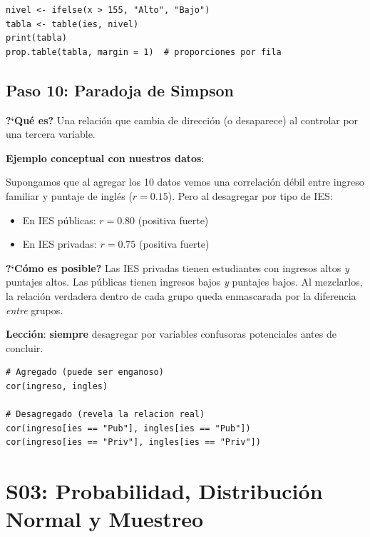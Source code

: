 \documentclass[11pt, a4paper]{article}
\begin{document}
\begin{lstlisting}
nivel <- ifelse(x > 155, "Alto", "Bajo")
tabla <- table(ies, nivel)
print(tabla)
prop.table(tabla, margin = 1)  # proporciones por fila
\end{lstlisting}

\subsection{Paso 10: Paradoja de Simpson}

\textbf{?`Qu\'e es?} Una relaci\'on que cambia de direcci\'on (o desaparece) al controlar
por una tercera variable.

\textbf{Ejemplo conceptual con nuestros datos}:

Supongamos que al agregar los 10 datos vemos una correlaci\'on d\'ebil entre ingreso
familiar y puntaje de ingl\'es ($r = 0.15$). Pero al desagregar por tipo de IES:
\begin{itemize}
  \item En IES p\'ublicas: $r = 0.80$ (positiva fuerte)
  \item En IES privadas: $r = 0.75$ (positiva fuerte)
\end{itemize}

\textbf{?`C\'omo es posible?} Las IES privadas tienen estudiantes con ingresos altos
\emph{y} puntajes altos. Las p\'ublicas tienen ingresos bajos \emph{y} puntajes bajos.
Al mezclarlos, la relaci\'on verdadera dentro de cada grupo queda enmascarada por la
diferencia \emph{entre} grupos.

\textbf{Lecci\'on}: \textbf{siempre} desagregar por variables confusoras potenciales antes de concluir.

\begin{lstlisting}
# Agregado (puede ser enganoso)
cor(ingreso, ingles)

# Desagregado (revela la relacion real)
cor(ingreso[ies == "Pub"], ingles[ies == "Pub"])
cor(ingreso[ies == "Priv"], ingles[ies == "Priv"])
\end{lstlisting}

\section{S03: Probabilidad, Distribuci\'on Normal y Muestreo}
\end{document}
